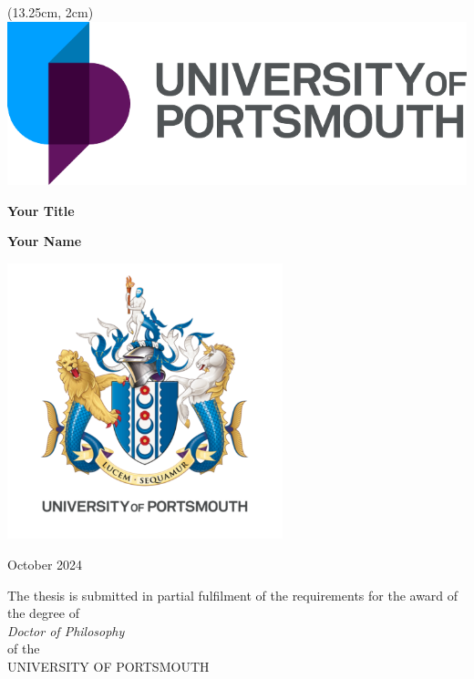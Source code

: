 \begin{titlepage}
    \begin{center}
        \begin{textblock*}{6cm}(13.25cm, 2cm) %
            \includegraphics[width=\textwidth]{images/preamble/UoP_Logo.pdf}
        \end{textblock*}

        \vspace*{1.5cm}

        \begin{tcolorbox}[colback=gray!10, colframe=white, boxrule=0pt, sharp corners, width=\paperwidth, height=5cm, valign=center, enlarge left by=-2in, enlarge right by=-1.6in]
            \centering
            \parbox{0.6\textwidth}{ %
                \centering
                \Huge \textbf{Your Title}
            }
        \end{tcolorbox}

        \vspace{0.5cm}
        \Huge \textbf{Your Name}

        \vspace{0.5cm}

        \includegraphics[width=0.6\textwidth]{images/preamble/UoP_Crest.pdf}
        
        \small October 2024

        \vspace{1.0cm}

        {The thesis is submitted in partial fulfilment of the requirements for the award of the degree of}\\
        {\textit{Doctor of Philosophy}}\\
        {of the}\\
        {UNIVERSITY OF PORTSMOUTH}

    \end{center}
\end{titlepage}
